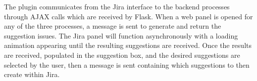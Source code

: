 The plugin communicates from the Jira interface to the backend processes through AJAX calls which are received by Flask. When a web panel is opened for any of the three processes, a message is sent to generate and return the suggestion issues. The Jira panel will function asynchronously with a loading animation appearing until the resulting suggestions are received. Once the results are received, populated in the suggestion box, and the desired suggestions are selected by the user, then a message is sent containing which suggestions to then create within Jira.
